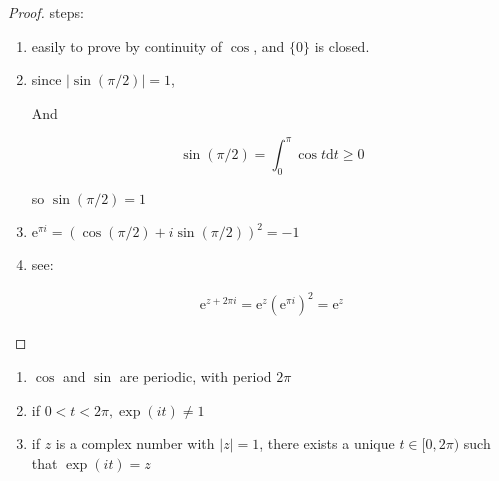 \begin{proof}
   steps:
   
   \begin{enumerate}
    \item easily to prove by continuity of $\cos$, and $\{ 0 \}$ is closed.

    \item since $| \sin (\pi /2) |  = 1$,

    And 

    \[
        \sin (\pi /2) = \int_0^{\pi} \cos t \mathrm{d}t \ge 0
    \]
    
    so $\sin (\pi / 2) = 1$

    \item $\mathrm{e}^{\pi i} = (\cos (\pi / 2) + i \sin(\pi /2))^2 = -1$

    \item see:
    
    \begin{align*}
        \mathrm{e}^{z + 2\pi i} = \mathrm{e}^z (\mathrm{e}^{\pi i})^2 = \mathrm{e}^z
    \end{align*}
   \end{enumerate}

\end{proof}

\begin{thm}
    \begin{enumerate}
        \item $\cos$ and $\sin$ are periodic, with period $2 \pi$
        \item if $0 < t < 2\pi, \exp(it) \ne 1$
        \item if $z$ is a complex number with $|z| = 1$, there exists a unique $t \in [0,2\pi)$
        such that $\exp(it) = z$
    \end{enumerate}
\end{thm}

